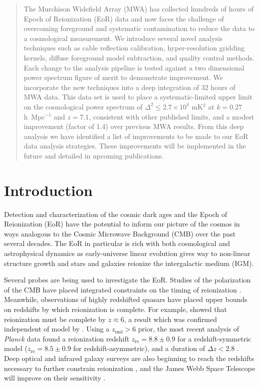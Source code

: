 \documentclass[iop]{emulateapj}
\begin{document}
\begin{abstract}
The Murchison Widefield Array (MWA) has collected hundreds of hours of Epoch of 
Reionization (EoR) data and now faces the challenge of overcoming foreground and 
systematic contamination to reduce the data to a cosmological measurement. We introduce 
several novel analysis techniques such as cable reflection calibration, hyper-resolution 
gridding kernels, diffuse foreground model subtraction, and quality control methods. Each 
change to the analysis pipeline is tested against a two dimensional power spectrum figure 
of merit to demonstrate improvement. We incorporate the new techniques into a deep 
integration of 32 hours of MWA data. This data set is used to place a systematic-limited 
upper limit on the cosmological power spectrum of $\Delta^2 \leq 2.7 \times 10^4$ 
mK$^2$ at $k=0.27$ h~Mpc$^{-1}$ and $z=7.1$, consistent with other published limits, and a 
modest improvement (factor of 1.4) over previous MWA results. 
From this deep analysis we have identified a list of improvements to be made to our EoR
data analysis strategies. These improvements will be implemented in the future and detailed
in upcoming publications.
\end{abstract}
\maketitle

\section{Introduction}

Detection and characterization of the cosmic dark ages and the Epoch of Reionization 
(EoR) have the potential to inform our picture of the cosmos in ways analogous to the 
Cosmic Microwave Background (CMB) over the past several decades. The EoR in 
particular is rich with both cosmological and astrophysical dynamics as early-universe linear 
evolution gives way to non-linear structure growth and stars and galaxies reionize the 
intergalactic medium (IGM).

Several probes are being used to investigate the EoR. 
Studies of the polarization of the CMB have placed integrated constraints on 
the timing of reionization \citep[e.g.][]{Planck:2015b, Planck:2015, WMAP9}. Meanwhile, 
observations of highly redshifted quasars have placed upper bounds on redshifts by which 
reionization is complete. For example, \citealt{Fan:2006a} showed that reionization must be 
complete by $z \approx 6$, a result which was confirmed independent of model by 
\citealt{McGreer:2015}.
Using a $z_{\mathrm{end}}>6$ prior, the most recent analysis of \emph{Planck} data 
found a reionization redshift $z_{\mathrm{re}} = 8.8 \pm 0.9$ for a redshift-symmetric model
($z_{\mathrm{re}} = 8.5 \pm 0.9$ for redshift-asymmetric), and a duration of $\Delta z < 2.8$
\citep{Planck:2016}.
Deep optical and infrared galaxy surveys are also beginning to 
reach the redshifts necessary to further constrain reionization \citep[e.g.][]{Bouwens:2014}, 
and the James Webb Space Telescope will improve on their sensitivity 
\citep{Gardner:2006}.
\end{document}
